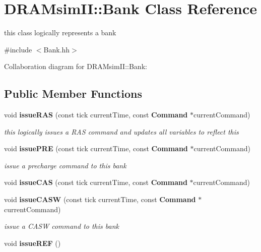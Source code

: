 \section{DRAMsimII::Bank Class Reference}
\label{class_d_r_a_msim_i_i_1_1_bank}


this class logically represents a bank  




{\ttfamily \#include $<$Bank.hh$>$}



Collaboration diagram for DRAMsimII::Bank:\subsection*{Public Member Functions}
\begin{DoxyCompactItemize}
\item 
void {\bf issueRAS} (const tick currentTime, const {\bf Command} $\ast$currentCommand)\label{class_d_r_a_msim_i_i_1_1_bank_a58c189cd77508d1fdf98335554823d97}

\begin{DoxyCompactList}\small\item\em this logically issues a RAS command and updates all variables to reflect this \item\end{DoxyCompactList}\item 
void {\bf issuePRE} (const tick currentTime, const {\bf Command} $\ast$currentCommand)\label{class_d_r_a_msim_i_i_1_1_bank_a6ec29dfb3c6fa9a12be7057ea7878125}

\begin{DoxyCompactList}\small\item\em issue a precharge command to this bank \item\end{DoxyCompactList}\item 
void {\bf issueCAS} (const tick currentTime, const {\bf Command} $\ast$currentCommand)
\item 
void {\bf issueCASW} (const tick currentTime, const {\bf Command} $\ast$currentCommand)\label{class_d_r_a_msim_i_i_1_1_bank_a3db7fb5a6064cde0b141a2adc6547538}

\begin{DoxyCompactList}\small\item\em issue a CASW command to this bank \item\end{DoxyCompactList}\item 
void {\bf issueREF} ()\label{class_d_r_a_msim_i_i_1_1_bank_ae95c270613412c1435c931e30b6860a9}


\end{DoxyCompactItemize}
